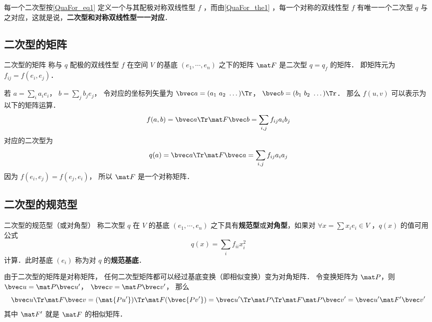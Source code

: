 每一个二次型按\autoref{QuaFor_eq1} 定义一个与其配极对称双线性型 $f$ ，而由\autoref{QuaFor_the1} ，每一个对称的双线性型 $f$ 有唯一一个二次型 $q$ 与之对应，这就是说，\textbf{二次型和对称双线性型一一对应}．

\subsection{二次型的矩阵}
\begin{definition}{二次型的矩阵}
称与 $q$ 配极的双线性型 $f$ 在空间 $V$ 的基底 $(e_1,\cdots,e_n)$ 之下的矩阵 $\mat F$ 是二次型 $q=q_f$ 的矩阵． 即矩阵元为 $f_{ij} = f(e_i, e_j)$．
\end{definition}

若 $a = \sum_i a_i e_i$， $b = \sum_j b_j e_j$， 令对应的坐标列矢量为 $\bvec a = (a_1\ a_2\ \dots)\Tr$， $\bvec b = (b_1\ b_2\ \dots)\Tr$． 那么 $f(u, v)$ 可以表示为以下的矩阵运算．
\begin{equation}
f(a, b) = \bvec a\Tr \mat F \bvec b = \sum_{i,j} f_{ij}a_i b_j
\end{equation}
对应的二次型为
\begin{equation}
q(a) = \bvec a\Tr \mat F \bvec a = \sum_{i,j} f_{ij}a_i a_j
\end{equation}
因为 $f(e_i, e_j) = f(e_j, e_i)$， 所以 $\mat F$ 是一个对称矩阵．

\subsection{二次型的规范型}
\begin{definition}{二次型的规范型（或对角型）}\label{QuaFor_def1}
称二次型 $q$ 在 $V$ 的基底 $(e_1,\cdots,e_n)$ 之下具有\textbf{规范型}或\textbf{对角型}，如果对 $\forall x=\sum x_i e_i\in V$ ，$q(x)$ 的值可用公式
\begin{equation}
q(x)=\sum_{i}f_{ii}x_i^2
\end{equation}
计算．此时基底 $(e_i)$ 称为对 $q$ 的\textbf{规范基底}．
\end{definition}

由于二次型的矩阵是对称矩阵， 任何二次型矩阵都可以经过基底变换（即相似变换）变为对角矩阵． 令变换矩阵为 $\mat P$，则 $\bvec u = \mat P \bvec u'$， $\bvec v = \mat P \bvec v'$， 那么
\begin{equation}
\bvec u\Tr \mat F \bvec v = (\mat {Pu'})\Tr \mat F (\bvec {Pv'}) = \bvec u'\Tr \mat P\Tr\mat F \mat P \bvec v'=\bvec u'\mat F' \bvec v'
\end{equation}
其中 $\mat F'$ 就是 $\mat F$ 的相似矩阵．
